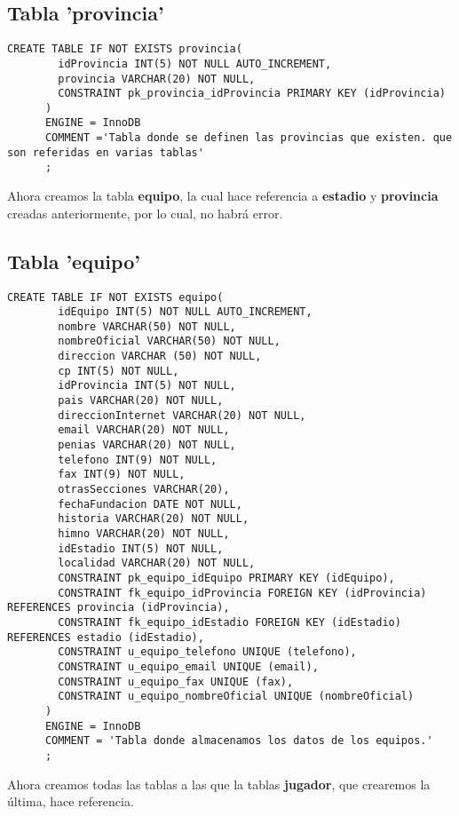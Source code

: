 \documentclass{article}
\begin{document}
\newpage
   \subsection{Tabla 'provincia'}   
    \begin{lstlisting}[style=C]
      CREATE TABLE IF NOT EXISTS provincia(
        idProvincia INT(5) NOT NULL AUTO_INCREMENT,
        provincia VARCHAR(20) NOT NULL,
        CONSTRAINT pk_provincia_idProvincia PRIMARY KEY (idProvincia)
      )
      ENGINE = InnoDB
      COMMENT ='Tabla donde se definen las provincias que existen. que son referidas en varias tablas'
      ;
    \end{lstlisting}

\newpage
  Ahora creamos la tabla \textbf{equipo}, la cual hace referencia a \textbf{estadio} y \textbf{provincia} creadas 
  anteriormente, por lo cual, no habrá error.
  \subsection{Tabla 'equipo'}
    \begin{lstlisting}[style=C]
      CREATE TABLE IF NOT EXISTS equipo(
        idEquipo INT(5) NOT NULL AUTO_INCREMENT,
        nombre VARCHAR(50) NOT NULL,
        nombreOficial VARCHAR(50) NOT NULL,
        direccion VARCHAR (50) NOT NULL,
        cp INT(5) NOT NULL,
        idProvincia INT(5) NOT NULL,
        pais VARCHAR(20) NOT NULL,
        direccionInternet VARCHAR(20) NOT NULL,
        email VARCHAR(20) NOT NULL,
        penias VARCHAR(20) NOT NULL,
        telefono INT(9) NOT NULL,
        fax INT(9) NOT NULL,
        otrasSecciones VARCHAR(20),
        fechaFundacion DATE NOT NULL,
        historia VARCHAR(20) NOT NULL,
        himno VARCHAR(20) NOT NULL,
        idEstadio INT(5) NOT NULL,
        localidad VARCHAR(20) NOT NULL,
        CONSTRAINT pk_equipo_idEquipo PRIMARY KEY (idEquipo),
        CONSTRAINT fk_equipo_idProvincia FOREIGN KEY (idProvincia) REFERENCES provincia (idProvincia),
        CONSTRAINT fk_equipo_idEstadio FOREIGN KEY (idEstadio) REFERENCES estadio (idEstadio),
        CONSTRAINT u_equipo_telefono UNIQUE (telefono),
        CONSTRAINT u_equipo_email UNIQUE (email),
        CONSTRAINT u_equipo_fax UNIQUE (fax),
        CONSTRAINT u_equipo_nombreOficial UNIQUE (nombreOficial)
      )
      ENGINE = InnoDB
      COMMENT = 'Tabla donde almacenamos los datos de los equipos.'
      ;
    \end{lstlisting}

\newpage
  Ahora creamos todas las tablas a las que la tablas \textbf{jugador}, que crearemos la última, hace referencia.
\end{document}
